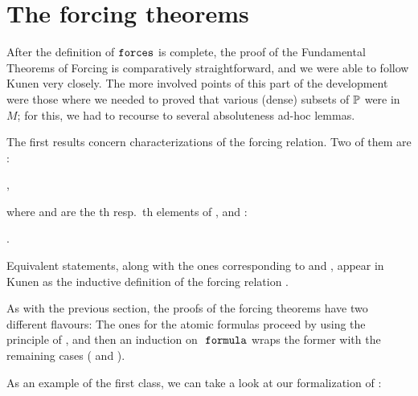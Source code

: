 \section{The forcing theorems}
\label{sec:forcing-theorems}

After the definition of $\mathop{\mathtt{forces}}$ is complete, the proof of the
Fundamental Theorems of Forcing is comparatively straightforward, and
we were able to follow Kunen very closely. The more involved points of
this part of the development were those where we needed to proved that
various (dense) subsets of $\mathbb{P}$ were in $M$; for this, we had to
recourse to several absoluteness ad-hoc lemmas.

The first results concern characterizations of the forcing
relation. Two of them are :
\begin{center}
  ,
\end{center}
where  and  are the
th resp.\ th elements of , and  :
\begin{center}
  .
\end{center}
Equivalent statements, along with the ones corresponding to  and
, appear in Kunen as the
inductive definition of the forcing relation \cite[Def.~IV.2.42]{kunen2011set}.

As with the previous section, the proofs of the forcing theorems have two different
flavours: The ones for the atomic formulas proceed by using the
principle of 
, and then an induction on
$\formula$ wraps the former with the remaining cases ( and ). 

As an example of the first class, we can take a look at our
formalization of \cite[Lem.~IV.2.40(a)]{kunen2011set}:

